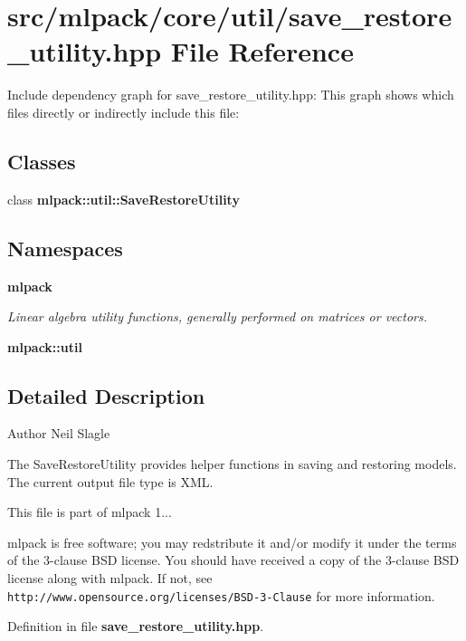 \section{src/mlpack/core/util/save\-\_\-restore\-\_\-utility.hpp File Reference}
\label{save__restore__utility_8hpp}
Include dependency graph for save\-\_\-restore\-\_\-utility.\-hpp\-:
This graph shows which files directly or indirectly include this file\-:
\subsection*{Classes}
\begin{DoxyCompactItemize}
\item 
class {\bf mlpack\-::util\-::\-Save\-Restore\-Utility}
\end{DoxyCompactItemize}
\subsection*{Namespaces}
\begin{DoxyCompactItemize}
\item 
{\bf mlpack}
\begin{DoxyCompactList}\small\item\em Linear algebra utility functions, generally performed on matrices or vectors. \end{DoxyCompactList}\item 
{\bf mlpack\-::util}
\end{DoxyCompactItemize}


\subsection{Detailed Description}
\begin{DoxyAuthor}{Author}
Neil Slagle
\end{DoxyAuthor}
The Save\-Restore\-Utility provides helper functions in saving and restoring models. The current output file type is X\-M\-L.

This file is part of mlpack 1...

mlpack is free software; you may redstribute it and/or modify it under the terms of the 3-\/clause B\-S\-D license. You should have received a copy of the 3-\/clause B\-S\-D license along with mlpack. If not, see {\tt http\-://www.\-opensource.\-org/licenses/\-B\-S\-D-\/3-\/\-Clause} for more information. 

Definition in file {\bf save\-\_\-restore\-\_\-utility.\-hpp}.

